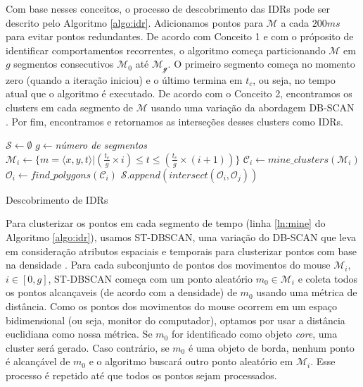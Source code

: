 Com base nesses conceitos, o processo de descobrimento das IDRs pode ser descrito pelo Algoritmo \ref{algo:idr}. Adicionamos pontos para $\mathcal{M}$ a cada $200ms$ para evitar pontos redundantes. De acordo com Conceito 1 e com o próposito de identificar comportamentos recorrentes, o algoritmo começa particionando $\mathcal{M}$ em $g$ segmentos consecutivos $\mathcal{M_0}$ até $\mathcal{M_g}$. O primeiro segmento começa no momento zero (quando a iteração iniciou) e o último termina em $t_c$, ou seja, no tempo atual que o algoritmo é executado. De acordo com o Conceito 2, encontramos os clusters em cada segmento de $\mathcal{M}$ usando uma variação da abordagem DB-SCAN \cite{Ester:1996}. Por fim, encontramos e retornamos as interseções desses clusters como IDRs.

\begin{algorithm}[t]
	\DontPrintSemicolon
	$\mathcal{S} \gets \emptyset$\;
	$g \gets ${\em número de segmentos}\;
	{
		   $\mathcal{M}_i \gets \{m = \langle x,y,t \rangle | (\frac{t_c}{g} \times i) \leq t \leq (\frac{t_c}{g} \times (i+1))\}$\;
		   $\mathcal{C}_i \gets \mathit{mine\_clusters}(\mathcal{M}_i)$\label{ln:mine}\;
		   $\mathcal{O}_i \gets \mathit{find\_polygons}(\mathcal{C}_i)$\label{ln:poly}\;
	}
	{
		   $\mathcal{S}.\mathit{append}(\mathit{intersect}(\mathcal{O}_i, \mathcal{O}_j))$
	}
	\; 
	\caption{Descobrimento de IDRs}
	\label{algo:idr}
\end{algorithm}

Para clusterizar os pontos em cada segmento de tempo (linha \ref{ln:mine} do Algoritmo \ref{algo:idr}), usamos ST-DBSCAN, uma variação do DB-SCAN que leva em consideração atributos espaciais e temporais para clusterizar pontos com base na densidade \cite{Birant:2007}. Para cada subconjunto de pontos dos movimentos do mouse $\mathcal{M}_i$, $i \in [0,g]$, ST-DBSCAN começa com um ponto aleatório $m_0 \in \mathcal{M}_i$ e coleta todos os pontos alcançaveis (de acordo com a densidade) de $m_0$ usando uma métrica de distância. Como os pontos dos movimentos do mouse ocorrem em um espaço bidimensional (ou seja, monitor do computador), optamos por usar a distância euclidiana como nossa métrica. Se $m_0$ for identificado como objeto {\em core}, uma cluster será gerado. Caso contrário, se $m_0$ é uma objeto de borda, nenhum ponto é alcançável de $m_0$ e o algoritmo buscará outro ponto aleatório em $\mathcal{M}_i$. Esse processo é repetido até que todos os pontos sejam processados.

